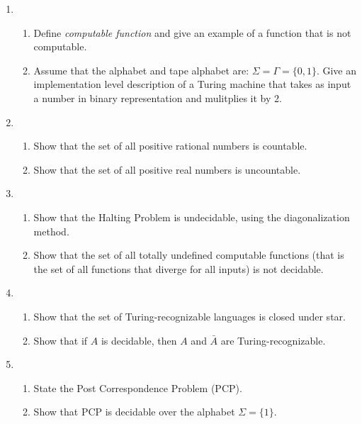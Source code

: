 \documentclass[11pt]{article}
\begin{document}
\begin{enumerate}
\item
\begin{enumerate}
	\item Define {\em computable function} and give an example of a function
		that is not computable.
	\item Assume that the alphabet and tape alphabet are: 
		$\Sigma = \Gamma = \{0,1\}$.
		Give an implementation level description of a Turing machine that
		takes as input a number in binary representation and mulitplies it
		by 2.

\end{enumerate}

\item 
\begin{enumerate}
	\item Show that the set of all positive rational numbers is countable.
	\item Show that the set of all positive real numbers is uncountable.
	
\end{enumerate}
\item 
\begin{enumerate}
	\item Show that the Halting Problem is undecidable, using the diagonalization method.
	\item Show that the set of all totally undefined computable functions (that is the set of
		all functions that diverge for all inputs) is not decidable.
\end{enumerate}
\item
\begin{enumerate}
	\item Show that the set of Turing-recognizable languages is closed under star.
	\item Show that if $A$ is decidable, then $A$ and $\bar{A}$ are Turing-recognizable.
\end{enumerate} 
\item 
\begin{enumerate}
	\item State the Post Correspondence Problem (PCP).
	\item Show that PCP is decidable over the alphabet $\Sigma = \{1\}$.
\end{enumerate}


\end{enumerate}
\end{document}
